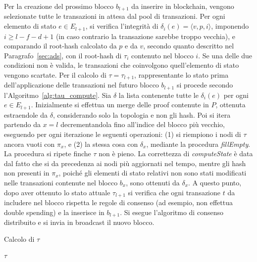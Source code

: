 Per la creazione del prossimo blocco $b_{l+1}$ da inserire in blockchain, vengono selezionate tutte le transazioni in attesa dal pool di transazioni. Per ogni elemento di stato $e \in E_{l+1}$, si verifica l'integrità di $\delta_i(e) = \langle v, p, i \rangle$, imponendo $i \geq l-f-d+1$ (in caso contrario la transazione sarebbe troppo vecchia), e comparando il root-hash calcolato da $p$ e da $v$, secondo quanto descritto nel Paragrafo~\ref{sec:ads}, con il root-hash di $\tau_i$ contenuto nel blocco $i$. Se una delle due condizioni non è valida, le transazioni che coinvolgono quell'elemento di stato vengono scartate.
Per il calcolo di $\tau = \tau_{l+1}$, rappresentante lo stato prima dell'applicazione delle transazioni nel futuro blocco $b_{l+1}$ si procede secondo l'Algoritmo~\ref{alg:tau_compute}.
Sia $\delta$ la lista contenente tutte le $\delta_i(e)$ per ogni $e \in E_{l+1}$. Inizialmente si effettua un merge delle proof contenute in $P$, ottenuta estraendole da $\delta$, considerando solo la topologia e non gli hash. Poi si itera partendo da $x = l$ decrementandola fino all'indice del blocco più vecchio, eseguendo per ogni iterazione le seguenti operazioni: (1) si riempiono i nodi di $\tau$ ancora vuoti con $\pi_x$, e (2) la stessa cosa con $\delta_x$, mediante la procedura \emph{fillEmpty}. La procedura si ripete finche $\tau$ non è pieno. La correttezza di \emph{computeState} è data dal fatto che si da precedenza ai nodi più aggiornati nel tempo, mentre gli hash non presenti in $\pi_x$, poiché gli elementi di stato relativi non sono stati modificati nelle transazioni contenute nel blocco $b_x$, sono ottenuti da $\delta_x$.
A questo punto, dopo aver ottenuto lo stato attuale $\tau_{l+1}$ si verifica che ogni transazione $t$ da includere nel blocco rispetta le regole di consenso (ad esempio, non effettua double spending) e la inserisce in $b_{l+1}$. Si esegue l'algoritmo di consenso distribuito e si invia in broadcast il nuovo blocco.
\begin{algorithm}
	\caption{Calcolo di $\tau$}
	\begin{algorithmic}
				\State {}
				\State {}
				\EndIf
			\EndFor
			\Return $\tau$
		\EndProcedure
	\end{algorithmic}
	\label{alg:tau_compute}
\end{algorithm}

